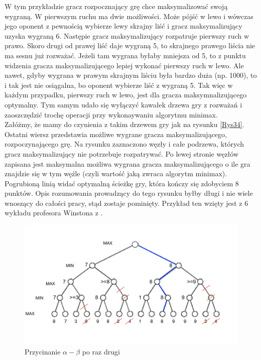 \documentclass[licencjacka]{pracamgr}
\begin{document}
W tym przykładzie gracz rozpocznający grę chce maksymalizować swoją wygraną. W pierwszym ruchu ma dwie możliwości. Może pójść w lewo i wówczas jego oponent z pewnością wybierze lewy skrajny liść i gracz maksymalizujący uzyska wygraną 6. Następie gracz maksymalizujący rozpatruje pierwszy ruch w prawo. Skoro drugi od prawej liść daje wygraną 5, to skrajnego prawego liścia nie ma sesnu już rozważać. Jeżeli tam wygrana byłaby mniejsza od 5, to z punktu widzenia gracza maksymalizującego lepiej wykonać pierwszy ruch w lewo. Ale nawet, gdyby wygrana w prawym skrajnym liściu była bardzo duża (np. 1000), to i tak jest nie osiągalna, bo oponent wybierze liść z wygraną 5. Tak więc w każdym przypadku, pierwszy ruch w lewo, jest dla gracza maksymnalizującego optymalny. Tym samym udało się wyłączyć kawałek drzewa gry z rozważań i zaoszczędzić trochę  operacji przy wykonaywaniu algorytmu minimax. \\

Załóżmy, że mamy do czynienia z takim drzewem gry jak na rysunku \ref{Rys34}. Ostatni wiersz przedstawia możliwe wygrane gracza maksymalizującego, rozpoczynającego grę. Na rysunku zaznaczono węzły i całe podrzewa, których gracz maksymalizujący nie potrzebuje rozpatrywać. Po lewej stronie węzłów zapisana jest maksymalna możliwa wygrana gracza maksymalizującego o ile gra znajdzie się w tym węźle (czyli wartość jaką zwraca algorytm minimax). Pogrubioną linią widać optymalną ścieżkę gry, która kończy się zdobyciem 8 punktów. Opis rozumowania prowadzący do tego rysunku byłby długi i nie wiele wnoszący do całości pracy, stąd zostaje pominięty. Przykład ten wzięty jest z 6 wykładu profesora Winstona z \cite{MIT_AI}.\\

\begin{figure}[h!]
	\includegraphics [scale=0.7] {big_tree2.png}
	\caption{Przycinanie $\alpha - \beta$ po raz drugi}
	\label{Rys4}
\end{figure}
\end{document}
